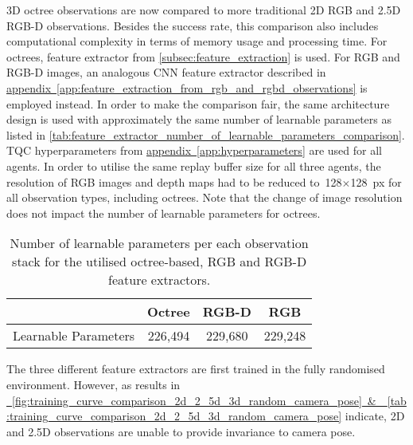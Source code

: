 3D octree observations are now compared to more traditional 2D RGB and 2.5D RGB-D observations. Besides the success rate, this comparison also includes computational complexity in terms of memory usage and processing time. For octrees, feature extractor from \autoref{subsec:feature_extraction} is used. For RGB and RGB-D images, an analogous CNN feature extractor described in \hyperref[app:feature_extraction_from_rgb_and_rgbd_observations]{appendix~\ref*{app:feature_extraction_from_rgb_and_rgbd_observations}} is employed instead.  In order to make the comparison fair, the same architecture design is used with approximately the same number of learnable parameters as listed in \autoref{tab:feature_extractor_number_of_learnable_parameters_comparison}. TQC hyperparameters from \hyperref[app:hyperparameters]{appendix~\ref*{app:hyperparameters}} are used for all agents. In order to utilise the same replay buffer size for all three agents, the resolution of RGB images and depth maps had to be reduced to~128\({\times}\)128~px for all observation types, including octrees. Note that the change of image resolution does not impact the number of learnable parameters for octrees.

\begin{table}[ht]
    \centering
    \begin{tabular}{l|ccc}
                             &
        \textbf{Octree}      & \textbf{RGB-D} & \textbf{RGB}           \\ \hline
        Learnable Parameters & 226,494        & 229,680      & 229,248
    \end{tabular}
    \caption{Number of learnable parameters per each observation stack for the utilised octree-based, RGB and RGB-D feature extractors.}
    \label{tab:feature_extractor_number_of_learnable_parameters_comparison}
\end{table}

The three different feature extractors are first trained in the fully randomised environment. However, as results in \hyperref[fig:training_curve_comparison_2d_2_5d_3d_random_camera_pose]{\figurename~\ref*{fig:training_curve_comparison_2d_2_5d_3d_random_camera_pose}~\&~\tablename~\ref*{tab:training_curve_comparison_2d_2_5d_3d_random_camera_pose}} indicate, 2D and 2.5D observations are unable to provide invariance to camera pose.

